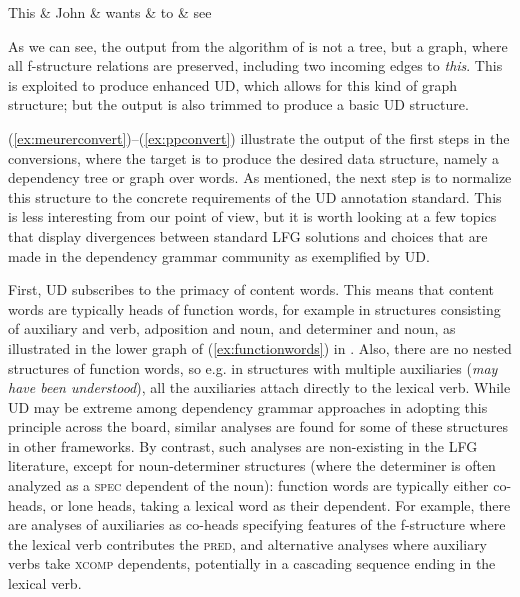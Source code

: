 \documentclass[output=paper,hidelinks]{langscibook}
\begin{document}
\begin{exe}
  \ex\label{ex:ppconvert}
  \begin{dependency}[baseline=-0.6ex,theme=simple]
    \begin{deptext}
      This \& John \& wants \& to \& see\\
    \end{deptext}
  \end{dependency}
\end{exe}

As we can see, the output from the algorithm of \citet{prz:pat:19:lre}
is not a tree, but a graph, where all f-structure relations are preserved, including two incoming edges to \textit{this}. This is exploited to produce enhanced UD, which allows for this kind of graph structure; but the
output is also trimmed to produce a basic UD structure.

(\ref{ex:meurerconvert})--(\ref{ex:ppconvert}) illustrate the output
of the first steps in the conversions, where the target is to produce
the desired data structure, namely a dependency tree or graph over
words. As mentioned, the next step is to normalize this structure to
the concrete requirements of the UD annotation standard. This is less
interesting from our point of view, but it is worth looking at a few
topics that display divergences between standard LFG solutions and
choices that are made in the dependency grammar community as
exemplified by UD.

First, UD subscribes to the primacy of content
words. This means that content words are typically heads of function
words, for example in structures consisting of auxiliary and verb,
adposition and noun, and determiner and noun, as illustrated in the lower graph of (\ref{ex:functionwords}) in . Also, there are
no nested structures of function words, so e.g. in structures with multiple auxiliaries (\textit{may have been understood}), all the auxiliaries attach directly to the lexical verb. While UD may be extreme among
dependency grammar approaches in adopting this principle across the
board, similar analyses are found for some of these structures in
other frameworks. By contrast, such analyses are non-existing in the
LFG literature, except for noun-determiner structures (where the
determiner is often analyzed as a \textsc{spec} dependent of the
noun): function words are typically either co-heads, or lone heads,
taking a lexical word as their dependent. For example, there are
analyses of auxiliaries as co-heads specifying features of the
f-structure where the lexical verb contributes the \textsc{pred}, and
alternative analyses where auxiliary verbs take \textsc{xcomp}
dependents, potentially in a cascading sequence ending in the lexical
verb.
\end{document}
